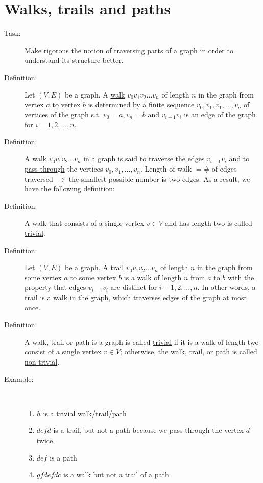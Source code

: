 \documentclass[10pt]{article}
\begin{document}
	\section{Walks, trails and paths}
	\begin{description}
		\item[Task:] Make rigorous the notion of traversing parts of a graph in order to understand its structure better.
		\item[Definition:] Let $(V, E)$ be a graph. A \underline{walk} $v_0 v_1 v_2... v_n$ of length $n$ in the graph from vertex $a$ to vertex $b$ is determined by a finite sequence $v_0, v_1, v_1, ..., v_n$ of vertices of the graph s.t. $v_0 = a, v_n = b$ and $v_{i-1} v_i$ is an edge of the graph for $i=1, 2, ..., n$.
		\item[Definition:] A walk $v_0 v_1 v_2 ... v_n$ in a graph is said to \underline{traverse} the edges $v_{i-1} v_i$ and to \underline{pass through} the vertices $v_0, v_1, ..., v_n$. Length of walk $= \#$ of edges traversed $\rightarrow$ the smallest possible number is two edges. As a result, we have the following definition:
		\item[Definition:] A walk that consists of a single vertex $v \in V$ and has length two is called \underline{trivial}.
		\item[Definition:] Let $(V, E)$ be a graph. A \underline{trail} $v_0 v_1 v_2 ... v_n$ of length $n$ in the graph from some vertex $a$ to some vertex $b$ is a walk of length $n$ from $a$ to $b$ with the property that edges $v_{i-1} v_i$ are distinct for $i-1, 2, ..., n$. In other words, a trail is a walk in the graph, which traverses edges of the graph at most once.
		\item[Definition:] A walk, trail or path is a graph is called \underline{trivial} if it is a walk of length two consist of a single vertex $v \in V$; otherwise, the walk, trail, or path is called \underline{non-trivial}.
		\item[Example:] ~\\
		\begin{enumerate}
			\item $h$ is a trivial walk/trail/path
			\item $defd$ is a trail, but not a path because we pass through the vertex $d$ twice.
			\item $def$ is a path
			\item $gfdefdc$ is a walk but not a trail of a path
		\end{enumerate}
		\begin{figure}[h!]
			\centering
\end{figure}
\end{description}
\end{document}
